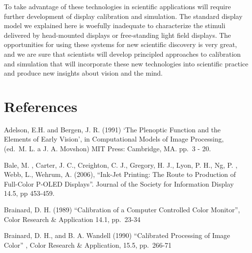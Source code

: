 \documentclass[
  letterpaper,
]{book}
\begin{document}
To take advantage of these technologies in scientific applications will
require further development of display calibration and simulation. The
standard display model we explained here is woefully inadequate to
characterize the stimuli delivered by head-mounted displays or
free-standing light field displays. The opportunities for using these
systems for new scientific discovery is very great, and we are sure that
scientists will develop principled approaches to calibration and
simulation that will incorporate these new technologies into scientific
practice and produce new insights about vision and the mind.

\section{References}\label{references}

Adelson, E.H. and Bergen, J. R. (1991) `The Plenoptic Function and the
Elements of Early Vision', in Computational Models of Image Processing,
(ed.~M. L. a J. A. Movshon) MIT Press: Cambridge, MA. pp.~3 - 20.

Bale, M. , Carter, J. C., Creighton, C. J., Gregory, H. J., Lyon, P. H.,
Ng, P. , Webb, L., Wehrum, A. (2006), ``Ink-Jet Printing: The Route to
Production of Full-Color P-OLED Displays''. Journal of the Society for
Information Display 14.5, pp 453-459.

Brainard, D. H. (1989) ``Calibration of a Computer Controlled Color
Monitor'', Color Research \& Application 14.1, pp.~23-34

Brainard, D. H., and B. A. Wandell (1990) ``Calibrated Processing of
Image Color'' , Color Research \& Application, 15.5, pp.~266-71
\end{document}
